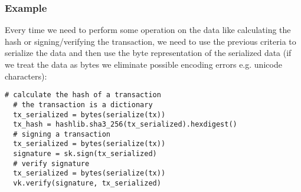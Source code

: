 \subsubsection{Example}
Every time we need to perform some operation on the data like calculating the hash or signing/verifying the transaction, we need to use the previous criteria to serialize the data and then use the byte representation of the serialized data (if we treat the data as bytes we eliminate possible encoding errors e.g. unicode characters):

\begin{minipage}{\linewidth}
  \begin{lstlisting}[style=python]
  # calculate the hash of a transaction 
  # the transaction is a dictionary 
  tx_serialized = bytes(serialize(tx)) 
  tx_hash = hashlib.sha3_256(tx_serialized).hexdigest() 
  # signing a transaction 
  tx_serialized = bytes(serialize(tx)) 
  signature = sk.sign(tx_serialized) 
  # verify signature 
  tx_serialized = bytes(serialize(tx)) 
  vk.verify(signature, tx_serialized)\end{lstlisting}
\end{minipage}

